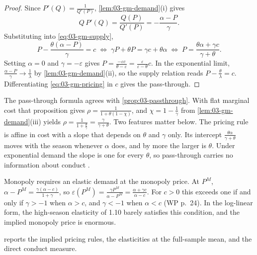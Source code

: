 \begin{proof}
Since $P'(Q) = \frac{1}{Q'(P)}$, \cref{lem:03-gm-demand}(i) gives
\begin{equation*}
Q\,P'(Q) = \frac{Q(P)}{Q'(P)} = -\frac{\alpha - P}{\gamma}.
\end{equation*}
Substituting into \eqref{eq:03-gm-supply},
\begin{equation*}
P - \frac{\theta(\alpha - P)}{\gamma} = c
\;\Longleftrightarrow\;
\gamma P + \theta P = \gamma c + \theta\alpha
\;\Longleftrightarrow\;
P = \frac{\theta\alpha + \gamma c}{\gamma + \theta}.
\end{equation*}
Setting $\alpha = 0$ and $\gamma = -\varepsilon$ gives $P = \frac{-\varepsilon c}{\theta - \varepsilon} =
\frac{\varepsilon}{\varepsilon - \theta}c$. In the exponential limit, $\frac{\alpha - P}{\gamma} \to
\frac{1}{\lambda}$ by \cref{lem:03-gm-demand}(ii), so the supply relation reads $P - \frac{\theta}{\lambda} =
c$. Differentiating \eqref{eq:03-gm-pricing} in $c$ gives the pass-through.
\end{proof}

The pass-through formula agrees with \cref{prop:03-passthrough}. With flat marginal cost that proposition
gives $\rho = \frac{1}{1 + \theta(1 - \chi)}$, and $\chi = 1 - \frac{1}{\gamma}$ from
\cref{lem:03-gm-demand}(iii) yields $\rho = \frac{1}{1 + \frac{\theta}{\gamma}} = \frac{\gamma}{\gamma +
\theta}$. Two features matter below. The pricing rule is affine in cost with a slope that depends on $\theta$
and $\gamma$ only. Its intercept $\frac{\theta\alpha}{\gamma + \theta}$ moves with the season whenever
$\alpha$ does, and by more the larger is $\theta$. Under exponential demand the slope is one for every
$\theta$, so pass-through carries no information about conduct \citep{BulowPfleiderer1983}.

Monopoly requires an elastic demand at the monopoly price. At $P^M$, $\alpha - P^M = \frac{\gamma(\alpha -
c)}{1 + \gamma}$, so $\varepsilon(P^M) = \frac{\gamma P^M}{\alpha - P^M} = \frac{\alpha + \gamma c}{\alpha -
c}$. For $c > 0$ this exceeds one if and only if $\gamma > -1$ when $\alpha > c$, and $\gamma < -1$ when
$\alpha < c$ (WP p.~24). In the log-linear form, the high-season elasticity of 1.10 barely satisfies this
condition, and the implied monopoly price is enormous.

 reports the implied pricing rules, the elasticities at the full-sample mean, and the
direct conduct measure.

